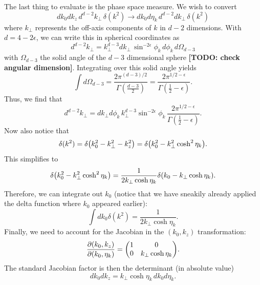 \documentclass[11pt,twoside,reqno]{amsart}
\theoremstyle{plain}
\theoremstyle{remark}
\theoremstyle{definition}
\theoremstyle{remark}
\theoremstyle{definition}
\theoremstyle{definition}
\begin{document}
	The last thing to evaluate is the phase space measure. We wish to convert
	\begin{equation}
		dk_0 dk_z \,d^{d-2} k_\perp\,\delta(k^2) \to dk_0 d\eta_k\,d^{d-2}dk_\perp\,\delta(k^2)
	\end{equation}
	where $k_\perp$ represents the off-axis components of $k$ in $d-2$ dimensions. With $d = 4 - 2\epsilon$, we can write this in spherical coordinates as
	\begin{equation}
		d^{d-2}k_\perp = k_\perp^{d-3} d k_\perp\,\sin^{-2\epsilon}\phi_k\,d\phi_k \,d\Omega_{d-3}
	\end{equation}
	with $\Omega_{d-3}$ the solid angle of the $d-3$ dimensional sphere {\color{red}\textbf{[TODO: check angular dimension]}}. Integrating over this solid angle yields \cite{schwartz_quantum_2014}
	\begin{equation}
		\int d\Omega_{d-3} = \frac{2\pi^{(d-3)/2}}{\Gamma(\frac{d-3}{2})} = \frac{2\pi^{1/2-\epsilon}}{\Gamma(\frac{1}{2} - \epsilon)}.
	\end{equation}
	Thus, we find that
	\begin{equation}
		d^{d-2}k_\perp = dk_\perp d\phi_k \,k_\perp^{d-3}\sin^{-2\epsilon}\phi_k\,\frac{2\pi^{1/2-\epsilon}}{\Gamma(\frac{1}{2}-\epsilon)}.
	\end{equation}
	Now also notice that
	\begin{equation}
		\delta(k^2) = \delta\qty(k_0^2 - k_\perp^2 - k_z^2) = \delta\qty(k_0^2 - k_\perp^2 \cosh^2\eta_k).
	\end{equation}
	This simplifies to
	\begin{equation}
		\delta\qty(k_0^2 - k_\perp^2 \cosh^2\eta_k) = \frac{1}{2k_\perp \cosh\eta_k}\delta\qty(k_0 - k_\perp \cosh\eta_k).
	\end{equation}
	Therefore, we can integrate out $k_0$ (notice that we have sneakily already applied the delta function where $k_0$ appeared earlier):
	\begin{equation}
		\int dk_0 \delta(k^2) = \frac{1}{2k_\perp \cosh\eta_k}.
	\end{equation}
	Finally, we need to account for the Jacobian in the $(k_0, k_z)$ transformation:
	\begin{equation}
		\frac{\partial(k_0, k_z)}{\partial(k_0, \eta_k)} = \mqty(
		1 & 0 \\ 
		0 & k_\perp \cosh\eta_k).
	\end{equation}
	The standard Jacobian factor is then the determinant (in absolute value)
	\begin{equation}
		dk_0 dk_z = k_\perp \cosh\eta_k \,dk_0 d\eta_k.
	\end{equation}
\end{document}
